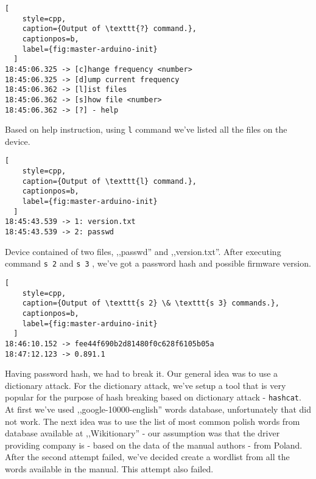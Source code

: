 \begin{minipage}{\linewidth}
  \begin{lstlisting}[
    style=cpp,
    caption={Output of \texttt{?} command.},
    captionpos=b,
    label={fig:master-arduino-init}
  ]
18:45:06.325 -> [c]hange frequency <number>
18:45:06.325 -> [d]ump current frequency
18:45:06.362 -> [l]ist files
18:45:06.362 -> [s]how file <number>
18:45:06.362 -> [?] - help
  \end{lstlisting}
  \end{minipage}

Based on help instruction, using \texttt{l} command we've listed all the files on the device.

\begin{minipage}{\linewidth}
  \begin{lstlisting}[
    style=cpp,
    caption={Output of \texttt{l} command.},
    captionpos=b,
    label={fig:master-arduino-init}
  ]
18:45:43.539 -> 1: version.txt
18:45:43.539 -> 2: passwd
  \end{lstlisting}
  \end{minipage}

Device contained of two files, ,,passwd'' and ,,version.txt''. After executing command \texttt{s 2} and \texttt{s 3} , we've got a password hash and possible firmware version.


\begin{minipage}{\linewidth}
  \begin{lstlisting}[
    style=cpp,
    caption={Output of \texttt{s 2} \& \texttt{s 3} commands.},
    captionpos=b,
    label={fig:master-arduino-init}
  ]
18:46:10.152 -> fee44f690b2d81480f0c628f6105b05a
18:47:12.123 -> 0.891.1
  \end{lstlisting}
  \end{minipage}

Having password hash, we had to break it. Our general idea was to use a dictionary attack. For the dictionary attack, we've setup a tool that is very popular for the purpose of hash breaking based on dictionary attack - \texttt{hashcat}. At first we've used ,,google-10000-english'' words database, unfortunately that did not work. The next idea was to use the list of most common polish words from database available at ,,Wikitionary'' - our assumption was that the driver providing company is - based on the data of the manual authors - from Poland. After the second attempt failed, we've decided create a wordlist from all the words available in the manual. This attempt also failed.

